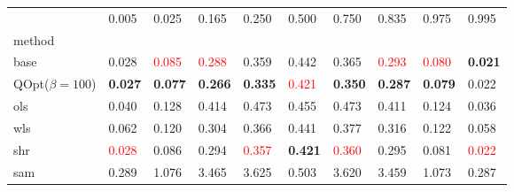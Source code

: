 \begin{tabular}{llllllllll}
\toprule
 & 0.005 & 0.025 & 0.165 & 0.250 & 0.500 & 0.750 & 0.835 & 0.975 & 0.995 \\
method &  &  &  &  &  &  &  &  &  \\
\midrule
base & 0.028 & \textcolor{red}{0.085} & \textcolor{red}{0.288} & 0.359 & 0.442 & 0.365 & \textcolor{red}{0.293} & \textcolor{red}{0.080} & \textbf{0.021} \\
\midrule
QOpt($\beta=100$) & \textbf{0.027} & \textbf{0.077} & \textbf{0.266} & \textbf{0.335} & \textcolor{red}{0.421} & \textbf{0.350} & \textbf{0.287} & \textbf{0.079} & 0.022 \\
ols & 0.040 & 0.128 & 0.414 & 0.473 & 0.455 & 0.473 & 0.411 & 0.124 & 0.036 \\
wls & 0.062 & 0.120 & 0.304 & 0.366 & 0.441 & 0.377 & 0.316 & 0.122 & 0.058 \\
shr & \textcolor{red}{0.028} & 0.086 & 0.294 & \textcolor{red}{0.357} & \textbf{0.421} & \textcolor{red}{0.360} & 0.295 & 0.081 & \textcolor{red}{0.022} \\
sam & 0.289 & 1.076 & 3.465 & 3.625 & 0.503 & 3.620 & 3.459 & 1.073 & 0.287 \\
\bottomrule
\end{tabular}
